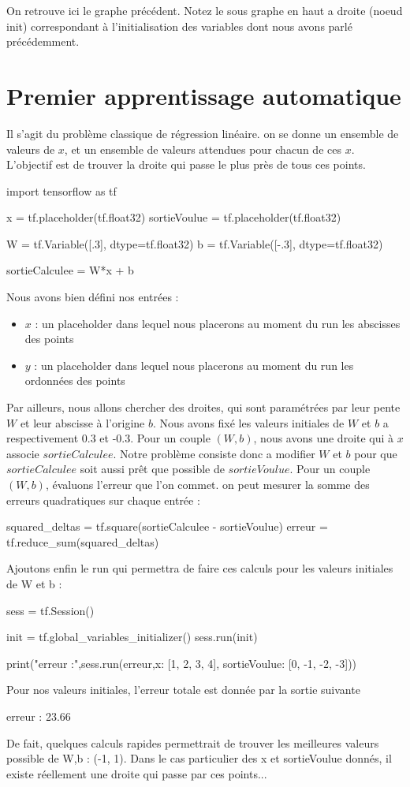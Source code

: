 \documentclass[a4paper,11pt]{book}
\theoremstyle{theo}
\begin{document}
On retrouve ici le graphe précédent. Notez le sous graphe en haut a droite (noeud init) correspondant à l'initialisation des variables dont nous avons parlé précédemment. 

\section{Premier apprentissage automatique}
Il s'agit du problème classique de régression linéaire. on se donne un ensemble de valeurs de $x$, et un ensemble de valeurs attendues pour chacun de ces $x$. L'objectif est de trouver la droite qui passe le plus près de tous ces points.
\begin{mypython}
import tensorflow as tf

x = tf.placeholder(tf.float32)
sortieVoulue = tf.placeholder(tf.float32)

W = tf.Variable([.3], dtype=tf.float32)
b = tf.Variable([-.3], dtype=tf.float32)

sortieCalculee = W*x + b
\end{mypython}
Nous avons bien défini nos entrées :
\begin{itemize}
\item $x$ : un placeholder dans lequel nous placerons au moment du run les abscisses des points
\item $y$ : un placeholder dans lequel nous placerons au moment du run les ordonnées des points
\end{itemize}

Par ailleurs, nous allons chercher des droites, qui sont paramétrées par leur pente $W$ et leur abscisse à l'origine $b$. Nous avons fixé les valeurs initiales de $W$ et $b$ a respectivement 0.3 et -0.3. Pour un couple $(W,b)$, nous avons une droite qui à $x$ associe $sortieCalculee$.
Notre problème consiste donc a modifier $W$ et $b$ pour que $sortieCalculee$ soit aussi prêt que possible de $sortieVoulue$.
Pour un couple $(W,b)$, évaluons l'erreur que l'on commet. on peut mesurer la somme des erreurs quadratiques sur chaque entrée :

\begin{mypython}
squared_deltas = tf.square(sortieCalculee - sortieVoulue)
erreur = tf.reduce_sum(squared_deltas)
\end{mypython}
Ajoutons enfin le run qui permettra de faire ces calculs pour les valeurs initiales de W et b :
\begin{mypython}
sess = tf.Session()

init = tf.global_variables_initializer()
sess.run(init)

print("erreur :",sess.run(erreur,{x: [1, 2, 3, 4], sortieVoulue: [0, -1, -2, -3]}))
\end{mypython}
Pour nos valeurs initiales, l'erreur totale est donnée par la sortie suivante
\begin{myoutput}
erreur : 23.66
\end{myoutput}
De fait, quelques calculs rapides permettrait de trouver les meilleures valeurs possible de W,b : (-1, 1). Dans le cas particulier des x et sortieVoulue donnés, il existe réellement une droite qui passe par ces points...
\end{document}
